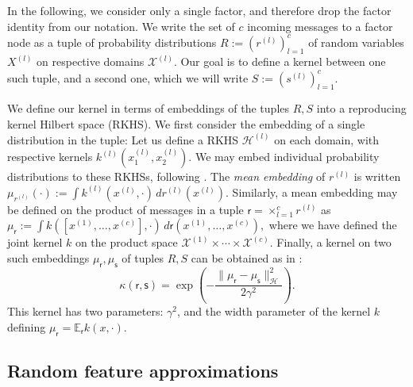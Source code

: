 \documentclass[english]{article}
\theoremstyle{plain}
\theoremstyle{plain}
\begin{document}
In the following, we consider only a single factor, and therefore drop the factor identity from our notation. We write the set of $c$ incoming messages to a factor node as a tuple of
probability distributions %
$R:=(r^{(l)})_{l=1}^c$ of random variables $X^{(l)}$ on respective  domains $\mathcal{X}^{(l)}$.
Our goal is to define a kernel between one such tuple, and a second one,
which we will write %
$S:=(s^{(l)})_{l=1}^c$.

We define our kernel in terms of embeddings of the tuples $R,S$ into a reproducing kernel Hilbert space (RKHS). We first consider the embedding of a single distribution
in the tuple: Let us define a RKHS
$\mathcal{H}^{(l)}$ on each domain, with respective kernels $k^{(l)}(x^{(l)}_1,x^{(l)}_2)$.
We may embed individual probability distributions to these RKHSs, following \citet{Smola2007}.
The {\em mean embedding} of $r^{(l)}$ is written
$\mu_{r^{(l)}}(\cdot) := \int k^{(l)}(x^{(l)},\cdot) \, dr^{(l)} (x^{(l)})$.
%
Similarly, a mean embedding may be defined on the product of  messages in a tuple
$\mathsf{r}=\times_{l=1}^{c}r^{(l)}$ as
%
$\mu_{\mathsf{r}}
:=
\int k([x^{(1)}, \ldots, x^{(c)}],\cdot) \, d\mathsf{r}(x^{(1)}, \ldots, x^{(c)}),$
where we have defined the joint kernel $k$ on the product space
$\mathcal{X}^{(1)}\times\cdots\times\mathcal{X}^{(c)}$.
Finally,  a kernel on two such embeddings $\mu_{\mathsf{r}},\mu_{\mathsf{s}}$ of tuples $R,S$ can be obtained as in \citet[eq. 9]{Christmann2010}:
%
\begin{equation}
\kappa(\mathsf{r}, \mathsf{s}) = \exp\left(-\frac{\|\mu_{\mathsf{r}}-\mu_{\mathsf{s}}\|_{\mathcal{H}}^{2}}{2\gamma^{2}}\right).
\label{eq:gauss_joint_emb}
\end{equation}
%
This kernel has two parameters: $\gamma^{2}$, and the width parameter of the kernel $k$ defining $\mu_{\mathsf{r}} = \mathbb{E}_{\mathsf{r}}k(x,\cdot)$.



\subsection{Random feature approximations}
\label{sec:randomFeatureApproximations}
\end{document}
